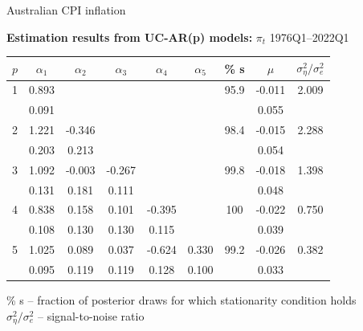 \documentclass[notes,blackandwhite,mathsans,usenames,dvipsnames]{beamer}
\begin{document}
\begin{frame}{Australian CPI inflation}

\small
\begin{center}
\textbf{Estimation results from UC-AR(p) models:} {\color{mcxs2}$\pi_t$ 1976Q1--2022Q1}

\footnotesize\smallskip\begin{tabular}{ccccccccc}
\toprule
$p$ & $\alpha_1$ & $\alpha_2$ & $\alpha_3$ & $\alpha_4$ & $\alpha_5$& \% s  & $\mu$  & $\sigma^2_\eta / \sigma^2_e$\\
\midrule
1 & 0.893 &  &  &  &  & 95.9 & -0.011 & 2.009 \\ 
   & 0.091 &  &  &  &  &  & 0.055 &  \\ [1ex]
  2 & 1.221 & -0.346 &  &  &  & 98.4 & -0.015 & 2.288 \\ 
   & 0.203 & 0.213 &  &  &  &  & 0.054 &  \\ [1ex]
  3 & 1.092 & -0.003 & -0.267 &  &  & 99.8 & -0.018 & 1.398 \\ 
   & 0.131 & 0.181 & 0.111 &  &  &  & 0.048 &  \\ [1ex]
  4 & 0.838 & 0.158 & 0.101 & -0.395 &  & 100 & -0.022 & 0.750 \\ 
   & 0.108 & 0.130 & 0.130 & 0.115 &  &  & 0.039 &  \\ [1ex]
  5 & 1.025 & 0.089 & 0.037 & -0.624 & 0.330 & 99.2 & -0.026 & 0.382 \\ 
   & 0.095 & 0.119 & 0.119 & 0.128 & 0.100 &  & 0.033 &  \\ [1ex]
\bottomrule
\end{tabular}

\smallskip 
\% s -- fraction of posterior draws for which stationarity condition holds\\
$\sigma^2_\eta / \sigma^2_e$ -- signal-to-noise ratio
\end{center}

\end{frame}
\end{document}
